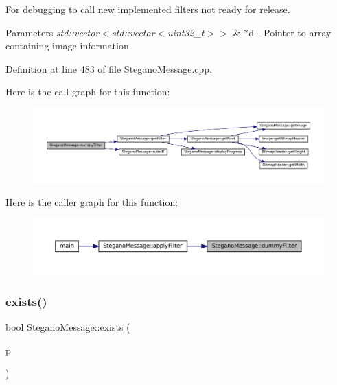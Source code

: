 For debugging to call new implemented filters not ready for release. 


\begin{DoxyParams}{Parameters}
{\em std\+::vector$<$std\+::vector$<$uint32\+\_\+t$>$$>$} & $\ast$d -\/ Pointer to array containing image information. \\
\hline
\end{DoxyParams}


Definition at line 483 of file Stegano\+Message.\+cpp.

Here is the call graph for this function\+:
\nopagebreak
\begin{figure}[H]
\begin{center}
\leavevmode
\includegraphics[width=350pt]{classSteganoMessage_a1a26242c2e6d146cba1ad6831ab60ba7_cgraph}
\end{center}
\end{figure}
Here is the caller graph for this function\+:
\nopagebreak
\begin{figure}[H]
\begin{center}
\leavevmode
\includegraphics[width=350pt]{classSteganoMessage_a1a26242c2e6d146cba1ad6831ab60ba7_icgraph}
\end{center}
\end{figure}
\mbox{\label{classSteganoMessage_acc5a49a35b46d8bf4c40cca8b8c5a52b}} 
\subsubsection{\texorpdfstring{exists()}{exists()}}
{\footnotesize\ttfamily bool Stegano\+Message\+::exists (\begin{DoxyParamCaption}\item[{std\+::string}]{p }\end{DoxyParamCaption})}



